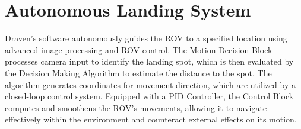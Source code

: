 \documentclass{article}
\begin{document}
\section{Autonomous Landing System}
Draven's software autonomously guides the ROV to a specified location using advanced image processing and ROV control. The Motion Decision Block processes camera input to identify the landing spot, which is then evaluated by the Decision Making Algorithm to estimate the distance to the spot. The algorithm generates coordinates for movement direction, which are utilized by a closed-loop control system. Equipped with a PID Controller, the Control Block computes and smoothens the ROV's movements, allowing it to navigate effectively within the environment and counteract external effects on its motion.%
\end{document}
